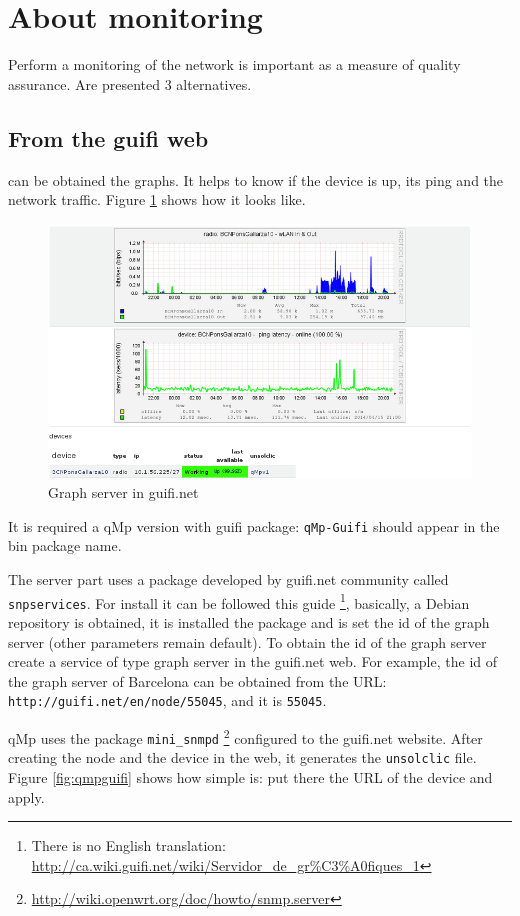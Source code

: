 \documentclass[11pt]{article}
\begin{document}
\section{About monitoring}
\label{sec-11}
Perform a monitoring of the network is important as a measure of
quality assurance. Are presented 3 alternatives.
\subsection{\textbf{From the guifi web}}
\label{sec-11-1}
can be obtained the graphs. It helps to know if the device is up, its
ping and the network traffic. Figure \ref{fig:snpservices} shows how it
looks like.

\begin{figure}[htb]
\centering
\includegraphics[width=.9\linewidth]{./img/general/snpservices.png}
\caption{\label{fig:snpservices}Graph server in guifi.net}
\end{figure}

It is required a qMp version with guifi package: \texttt{qMp-Guifi} should
appear in the bin package name.

The server part uses a package developed by guifi.net community called
\texttt{snpservices}. For install it can be followed this guide \footnote{There is no English translation: \url{http://ca.wiki.guifi.net/wiki/Servidor_de_gr\%C3\%A0fiques_1}},
basically, a Debian repository is obtained, it is installed the
package and is set the id of the graph server (other parameters remain
default). To obtain the id of the graph server create a service of
type graph server in the guifi.net web. For example, the id of the
graph server of Barcelona can be obtained from the URL:
\texttt{http://guifi.net/en/node/55045}, and it is \texttt{55045}.

qMp uses the package \texttt{mini\_snmpd} \footnote{\url{http://wiki.openwrt.org/doc/howto/snmp.server}} configured to the guifi.net
website. After creating the node and the device in the web, it
generates the \texttt{unsolclic} file. Figure \ref{fig:qmpguifi} shows how simple
is: put there the URL of the device and apply.
\end{document}
